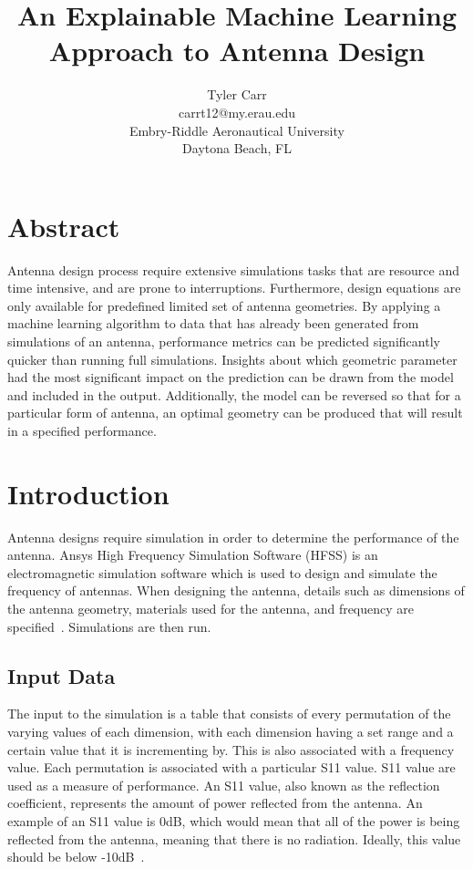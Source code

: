 \documentclass[11pt, notitlepage]{article}
\title{\textbf{An Explainable Machine Learning Approach to Antenna Design}}
\author{Tyler Carr \\ carrt12@my.erau.edu \\ Embry-Riddle Aeronautical University \\ Daytona Beach, FL}
\date{}
\begin{document}
\maketitle


\begin{multicols}{2}

\section*{Abstract}
Antenna design process require extensive simulations tasks that are resource and time intensive, and are prone to interruptions. Furthermore, design equations are only available for predefined limited set of antenna geometries. By applying a machine learning algorithm to data that has already been generated from simulations of an antenna, performance metrics can be predicted significantly quicker than running full simulations. Insights about which geometric parameter had the most significant impact on the prediction can be drawn from the model and included in the output. Additionally, the model can be reversed so that for a particular form of antenna, an optimal geometry can be produced that will result in a specified performance. 


\section{Introduction}
Antenna designs require simulation in order to determine the performance of the antenna. Ansys High Frequency Simulation Software (HFSS) is an electromagnetic simulation software which is used to design and simulate the frequency of antennas. When designing the antenna, details such as dimensions of the antenna geometry, materials used for the antenna, and frequency are specified~\cite{Maxworth_2022}. Simulations are then run.


\subsection{Input Data}
The input to the simulation is a table that consists of every permutation of the varying values of each dimension, with each dimension having a set range and a certain value that it is incrementing by. This is also associated with a frequency value. Each permutation is associated with a particular S11 value. S11 value are used as a measure of performance. An S11 value, also known as the reflection coefficient, represents the amount of power reflected from the antenna. An example of an S11 value is 0dB, which would mean that all of the power is being reflected from the antenna, meaning that there is no radiation. Ideally, this value should be below -10dB~\cite{Bevelacqua_2015}. 



\end{multicols}
\end{document}
